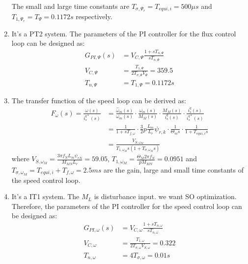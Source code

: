 \documentclass[12pt,a4paper, openany]{book}
\begin{document}
\begin{enumerate}
The small and large time constants are $T_{\sigma,\Psi_r}=T_{equi,i}=500\mu s$ and $T_{1,\Psi_r}=T_{\Psi}=0.1172s$ respectively.
\item 
It's a PT2 system. The parameters of the PI controller for the flux control loop can be designed as:
\begin{equation}
    \begin{aligned}
        G_{PI,\Psi}(s)&=V_{C,\Psi}\frac{1+sT_{n,\Psi}}{sT_{n,\Psi}}\\
        V_{C,\Psi}&=\frac{T_{1,\Psi}}{2T_{\sigma,\Psi}V_{\Psi}}=359.5\\
        T_{n,\Psi}&=T_{1,\Psi}=0.1172s
    \end{aligned}
\end{equation}
\setcounter{enumi}{13}
\item 
The transfer function of the speed loop can be derived as:
\begin{equation}
    \begin{aligned}
    F_{\omega}(s)=\frac{\omega(s)}{i_s^{q*}(s)} &=\frac{\hat{\omega}_m(s)}{{\omega}_m(s)}\cdot \frac{{\omega}_m(s)}{M_M(s)}\cdot \frac{M_M(s)}{i_s^{q}(s)}\cdot \frac{i_s^{q}(s)}{i_s^{q*}(s)}\\
        &=\frac{1}{1+sT_{f,\omega}}\cdot\frac{3}{2}p\frac{L_m}{L_{r}}\psi_{r,k} \cdot\frac{1}{\Theta_{m}s}\cdot \frac{1}{1+T_{equi,i}s}\\
        &=\frac{V_{S,\omega_{M}}}{T_{1,\omega_{M}}s(1+T_{\sigma,\omega_{M}}s)}
        \end{aligned} 
\end{equation}
    where $V_{S,\omega_{M}}=\frac{3\pi f_{N}L_m\psi_{rN}}{M_{MN}L_{r}}= 59.05$, $T_{1,\omega_{M}}=\frac{\Theta_M2\pi f_N}{pM_{MN}}=0.0951$ and $T_{\sigma,\omega_{M}}=T_{equi,i}+T_{f,\omega}=2.5ms$ are the gain, large and small time constants of the speed control loop.

\item
It's a IT1 system. The $M_{L}$ is disturbance input. we want SO optimization. Therefore, the parameters of the PI controller for the speed control loop can be designed as:
\begin{equation}
    \begin{aligned}
        G_{PI,\omega}(s)&=V_{C,\omega}\frac{1+sT_{n,\omega}}{sT_{n,\omega}}\\
        V_{C,\omega}&=\frac{T_{1,\omega}}{2T_{\sigma,\omega}V_{S,\omega}}=0.322\\
        T_{n,\omega}&=4T_{\sigma,\omega}=0.01s
    \end{aligned}
\end{equation}
\end{enumerate}
\end{document}
